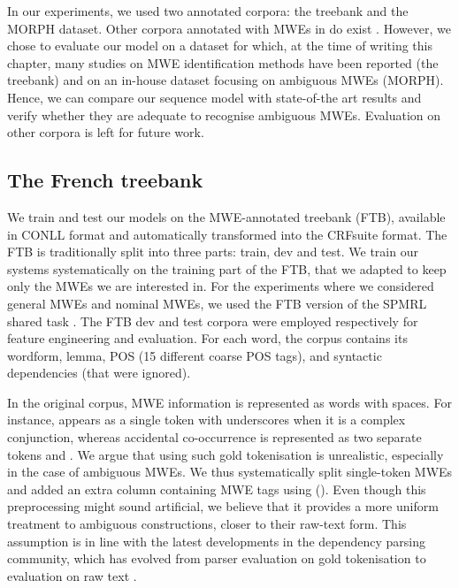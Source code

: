\documentclass[output=paper,
modfonts
]{langscibook}
\begin{document}
In our experiments, we used two annotated corpora: the  treebank and the MORPH dataset. Other corpora annotated with MWEs in  do exist \citep{Laporteetal08a,MWEWorkshop}. However, we chose to evaluate our model on a dataset for which, at the time of writing this chapter, many studies on MWE identification methods have been reported (the  treebank) and on an in-house dataset focusing on ambiguous MWEs (MORPH). Hence, we can compare our sequence model with state-of-the art results and verify whether they are adequate to recognise ambiguous MWEs. Evaluation on other corpora is left for future work.
 
\subsection{The French treebank} 
\label{subsec:ftb}

We train and test our models on the MWE-annotated  treebank (FTB), available in CONLL format and automatically transformed into the CRFsuite format. The FTB is traditionally split into three parts: train, dev and test. We train our systems systematically on the training part of the FTB, that we adapted to keep only the MWEs we are interested in. For the experiments where we considered general MWEs and nominal MWEs, we used the FTB version of the SPMRL shared task \citep{seddah-EtAl:2013:SPMRL}. The FTB dev and test corpora were employed respectively for feature engineering and evaluation.  For each word, the corpus contains its wordform, lemma, POS (15 different coarse POS tags), and syntactic dependencies (that were ignored).

In the original corpus, MWE information is represented as words with spaces. 
For instance,  appears as a single token with underscores when it is a complex conjunction, whereas accidental co-occurrence is represented as two separate tokens  and .
We argue that using such gold tokenisation is unrealistic, especially in the case of ambiguous MWEs.
We thus systematically split single-token MWEs and added an extra column containing MWE tags using  ().
Even though this preprocessing might sound artificial, we believe that it provides a more uniform treatment to ambiguous constructions, closer to their raw-text form.
This assumption is in line with the latest developments in the dependency parsing community, which has evolved from parser evaluation on gold tokenisation \citep{Buchholz:2006:CST:1596276.1596305} to evaluation on raw text \citep{zeman-EtAl:2017:K17-3}.
\end{document}
